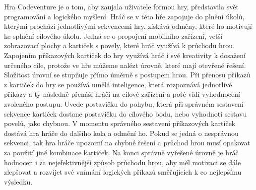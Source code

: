 
Hra Codeventure je o tom, aby zaujala uživatele formou hry, představila svět programování a logického myšlení. Hráč se v této hře zapojuje do plnění úkolů, kterými prochází jednotlivými sekvencemi hry, získává odměny, které ho motivují ke splnění cílového úkolu. Jedná se o propojení mobilního zařízení, vetší zobrazovací plochy a kartiček s povely, které hráč využívá k průchodu hrou. Zapojením příkazových kartiček do hry využívá hráč i své kreativity k dosažení určeného cíle, protože ve hře můžeme nalézt úrovně, které mají otevřené řešení. Složitost úrovní se stupňuje přímo úměrně s postupem hrou. Při přenosu příkazů z kartiček do hry se používá umělá inteligence, která rozpoznává jednotlivé příkazy a ty následně přenáší hráči na cílové zařízení a poté vidí vyhodnocení zvoleného postupu. Uvede postavičku do pohybu, která při správném sestavení sekvence kartiček dostane postavičku do cílového bodu, nebo vyhodnotí sestavu povelů, jako chybnou. V momentu správného sestavení příkazových kartiček dostává hra hráče do dalšího kola a odmění ho. Pokud se jedná o nesprávnou sekvenci, tak hra hráče upozorní na chybné řešení a průchod hrou musí opakovat za použití jiné kombinace kartiček. Na konci správně vyřešené úrovně je hráč hodnocen i za nejefektivnější způsob průchodu hrou, aby měl motivaci se dále zlepšovat a rozvíjet své vnímání logických příkazů směřujících k co nejlepšímu výsledku.